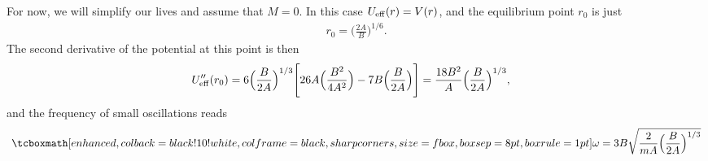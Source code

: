 {For now, we will simplify our lives and assume that $M = 0$.
In this case $U_{\rm eff}(r) = V(r)$, and the equilibrium point $r_0$ is just
\begin{align}
    r_0 = \Big( \frac{2 A}{B} \Big)^{1/6}
.\end{align}
The second derivative of the potential at this point is then
\begin{align}
    U_{\rm eff}''(r_0) &= 6 \Big( \frac{B}{2A} \Big)^{1/3} \Bigg[ 26 A \Big( \frac{B^2}{4 A^2} \Big) -  7 B \Big( \frac{B}{2 A} \Big) \Bigg] = \frac{18 B^2}{A} \Big( \frac{B}{2 A} \Big)^{1/3} 
,\end{align}
and the frequency of small oscillations reads
\begin{align}
    \eqbox{ \omega = 3 B \sqrt{\frac{2}{m A} \Big( \frac{B}{2A} \Big)^{1/3}} }
\end{align}

}



